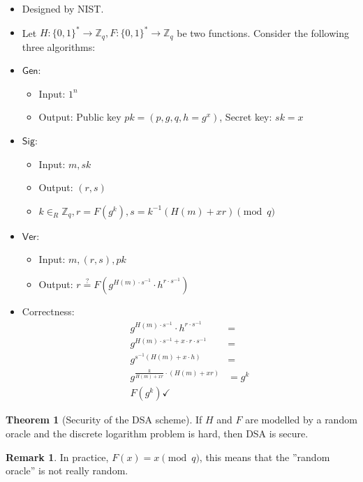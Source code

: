 \documentclass[11pt]{article}
\theoremstyle{definition}
\newtheorem{theorem}{Theorem}[section]
\newtheorem{remark}{Remark}[section]
\theoremstyle{proof}
\newcommand{\Gen}{\mathsf{Gen}}
\newcommand{\Sig}{\mathsf{Sig}}
\newcommand{\Ver}{\mathsf{Ver}}
\begin{document}
\begin{itemize}
	\item Designed by NIST.
	\item Let $H: \{0, 1\}^* \rightarrow \mathbb{Z}_q, F: \{0, 1\}^* \rightarrow \mathbb{Z}_q$ be two functions. Consider the following three algorithms:
	\item $\Gen$:
	\begin{itemize}
		\item Input: $1^n$
		\item Output: Public key $pk = (p, g, q, h = g^x)$, Secret key: $sk = x$
	\end{itemize}
	\item $\Sig$:
	\begin{itemize}
		\item Input: $m, sk$
		\item Output: $(r, s)$
		\item $k \in_R \mathbb{Z}_q, r = F(g^k), s = k^{-1}(H(m) + xr) \pmod{q}$
	\end{itemize}
	\item $\Ver$:
	\begin{itemize}
		\item Input: $m, (r, s), pk$
		\item Output: $r \stackrel{?}{=} F(g^{H(m) \cdot s^{-1}} \cdot h^{r \cdot s^{-1}})$
	\end{itemize}
	\item Correctness:
	\begin{align}
		g^{H(m) \cdot s^{-1}} \cdot h^{r \cdot s^{-1}} &= \\
		g^{H(m) \cdot s^{-1} + x \cdot r \cdot s^{-1}} &= \\
		g^{s^{-1}(H(m) + x \cdot h)} &= \\
		g^{\frac{k}{H(m) + xr} \cdot (H(m) + xr)} &= g^k \\
		F(g^k) \checkmark
	\end{align}
\end{itemize}

\begin{theorem}[Security of the DSA scheme]
	If $H$ and $F$ are modelled by a random oracle and the discrete logarithm problem is hard, then DSA is secure.
\end{theorem}

\begin{remark}
	In practice, $F(x) = x \pmod q$, this means that the ”random oracle” is not really random.
\end{remark}
\end{document}
